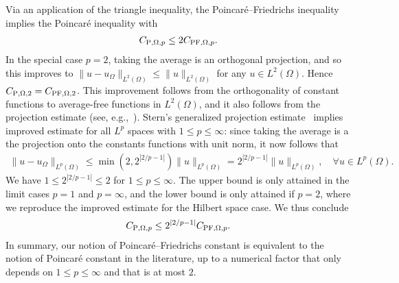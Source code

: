 \documentclass[10pt,letterpaper]{article}
\begin{document}
Via an application of the triangle inequality, 
the Poincar\'e--Friedrichs inequality implies the Poincar\'e inequality with 
\begin{align*}
    C_{{\rm P},\Omega,p} \leq 2 C_{{\rm PF},\Omega,p}.
\end{align*}
In the special case $p=2$, taking the average is an orthogonal projection, and so this improves to $\| u - u_\Omega \|_{L^{2}(\Omega)} \leq \| u \|_{L^{2}(\Omega)}$ for any $u \in L^{2}(\Omega)$. Hence $C_{{\rm P},\Omega,2} = C_{{\rm PF},\Omega,2}$. 
This improvement follows from the orthogonality of constant functions to average-free functions in $L^2(\Omega)$,
and it also follows from the projection estimate (see, e.g.,~\cite{xu2003some}).
Stern's generalized projection estimate~\cite[Theorem~4.1,Remark~5.1]{stern2015banach} implies improved estimate for all $L^{p}$ spaces with $1 \leq p \leq \infty$:
since taking the average is a the projection onto the constants functions with unit norm, it now follows that 
\begin{align*}
    \| u - u_\Omega \|_{L^{p}(\Omega)}
    \leq 
    \min\left( 2, 2^{|2/p-1|} \right)
    \| u \|_{L^{p}(\Omega)}
    = 
    2^{|2/p-1|} 
    \| u \|_{L^{p}(\Omega)}
    ,
    \quad 
    \forall 
    u \in L^{p}(\Omega)
    .
\end{align*}
We have $1 \leq 2^{|2/p-1|} \leq 2$ for $1 \leq p \leq \infty$.
The upper bound is only attained in the limit cases $p = 1$ and $p = \infty$, and the lower bound is only attained if $p = 2$, where we reproduce the improved estimate for the Hilbert space case.
We thus conclude 
\begin{align}\label{math:p_vs_pf}
    C_{{\rm P},\Omega,p} \leq 2^{|2/p-1|} C_{{\rm PF},\Omega,p}.
\end{align}
In summary, our notion of Poincar\'e--Friedrichs constant is equivalent to the notion of Poincar\'e constant in the literature, up to a numerical factor that only depends on $1 \leq p \leq \infty$ and that is at most $2$.
\\
\end{document}
